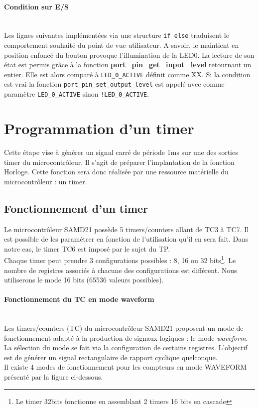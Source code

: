 \documentclass[a4paper]{article}
\begin{document}
	\paragraph{Condition sur E/S}
	~~\\
	Les lignes suivantes implémentées via une structure \texttt{if else} traduisent le comportement souhaité du point de vue utilisateur. A savoir, le maintient en position enfoncé du bouton provoque l'illumination de la LED0. La lecture de son état est permis grâce à la fonction \textbf{port\_pin\_get\_input\_level} retournant un entier. Elle est alors comparé à \texttt{LED\_0\_ACTIVE} définit comme XX. Si la condition est vrai la fonction \texttt{port\_pin\_set\_output\_level} est appelé avec comme paramètre \texttt{LED\_0\_ACTIVE} sinon \texttt{!LED\_0\_ACTIVE}.
	
	\newpage
	\section{Programmation d'un timer}
	Cette étape vise à générer un signal carré de période 1ms sur une des sorties timer du microcontrôleur. Il s'agit  de préparer l'implantation de la fonction Horloge. Cette fonction sera donc réalisée par une ressource matérielle du microcontrôleur : un timer.
	\subsection{Fonctionnement d'un timer}
	Le microcontrôleur SAMD21 possède 5 timers/counters allant de TC3 à TC7. Il est possible de les paramétrer en fonction de l’utilisation qu’il en sera fait. Dans notre cas, le timer TC6 est imposé par le sujet du TP.\\
	Chaque timer peut prendre 3 configurations possibles : 8, 16 ou 32 bits\footnote{Le timer 32bits fonctionne en assemblant 2 timers 16 bits en cascade}. Le nombre de registres associés à chacune des configurations est différent. Nous utiliserons le mode 16 bits (65536 valeurs possibles).  \\
	\paragraph{Fonctionnement du TC en mode waveform}
	~~\\
	Les timers/counters (TC) du microcontrôleur SAMD21 proposent un mode de fonctionnement adapté à la production de signaux logiques : le mode {\sl waveform}. La sélection du mode se fait via la configuration de certains registres. L'objectif est de générer un signal rectangulaire de rapport cyclique quelconque. \\
	Il existe 4 modes de fonctionnement pour les compteurs en mode WAVEFORM présenté par la figure ci-dessous. \\
	
\end{document}
